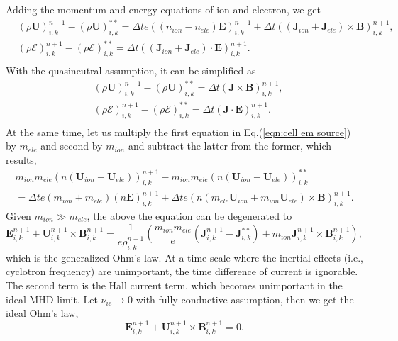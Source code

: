 \documentclass[preprint,3p,12pt,sort&compress]{elsarticle}
\begin{document}
Adding the momentum and energy equations of ion and electron, we get
\begin{equation}
\begin{aligned}
&(\rho \mathbf U)^{n+1}_{i,k} - (\rho \mathbf U)^{**}_{i,k}
= \Delta t e \left((n_{ion}-n_{ele}) \mathbf{E}\right)^{n+1}_{i,k}
+ \Delta t \left((\mathbf J_{ion} + \mathbf J_{ele}) \times \mathbf{B}\right)^{n+1}_{i,k}, \\
&(\rho \mathscr E)^{n+1}_{i,k} - (\rho \mathscr E)^{**}_{i,k}
=\Delta t \left((\mathbf J_{ion} + \mathbf J_{ele}) \cdot \mathbf{E} \right)^{n+1}_{i,k}. \\
\end{aligned}
\end{equation}
With the quasineutral assumption, it can be simplified as
\begin{equation}
\begin{aligned}
&(\rho \mathbf U)^{n+1}_{i,k} - (\rho \mathbf U)^{**}_{i,k}
= \Delta t \left(\mathbf J \times \mathbf{B}\right)^{n+1}_{i,k}, \\
&(\rho \mathscr E)^{n+1}_{i,k} - (\rho \mathscr E)^{**}_{i,k}
=\Delta t \left(\mathbf J \cdot \mathbf{E} \right)^{n+1}_{i,k}. \\
\end{aligned}
\end{equation}
At the same time, let us multiply the first equation in Eq.(\ref{eqn:cell em source}) by $m_{ele}$ and second by $m_{ion}$ and subtract the latter from the former, which results,
\begin{equation}
\begin{aligned}
m_{ion} m_{ele} \left(n\left(\mathbf U_{ion}-\mathbf U_{ele}\right)\right)^{n+1}_{i,k}
-m_{ion} m_{ele} \left(n\left(\mathbf U_{ion}-\mathbf U_{ele}\right)\right)^{**}_{i,k} \\
=\Delta t e \left(m_{ion}+m_{ele}\right) (n \mathbf E)^{n+1}_{i,k}
+\Delta t e \left(n \left(m_{ele} \mathbf U_{ion}+m_{ion} \mathbf U_{ele}\right) \times \mathbf{B}\right)^{n+1}_{i,k}.
\end{aligned}
\end{equation}
Given $m_{ion} \gg m_{ele}$, the above the equation can be degenerated to
\begin{equation}
\mathbf{E}_{i,k}^{n+1} + \mathbf{U}_{i,k}^{n+1} \times \mathbf{B}_{i,k}^{n+1}
=\frac{1}{e \rho_{i,k}^{n+1}}
\left(
\frac{m_{ion} m_{ele}}{e} (\mathbf J^{n+1}_{i,k} - \mathbf J^{**}_{i,k})
+m_{ion} \mathbf{J}^{n+1}_{i,k} \times \mathbf{B}^{n+1}_{i,k}
\right),
\end{equation}
which is the generalized Ohm's law.
At a time scale where the inertial effects (i.e., cyclotron frequency) are unimportant, the time difference of current is ignorable.
The second term is the Hall current term, which becomes unimportant in the ideal MHD limit.
Let $\nu_{ie} \to 0$ with fully conductive assumption, then we get the ideal Ohm's law,
\begin{equation}
\mathbf{E}_{i,k}^{n+1} + \mathbf{U}_{i,k}^{n+1} \times \mathbf{B}_{i,k}^{n+1}
=0.
\end{equation}
\end{document}
